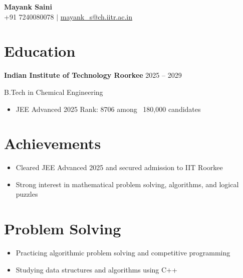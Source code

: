 \documentclass[letterpaper,11pt]{article}
\begin{document}

\begin{center}
\textbf{\Huge Mayank Saini} \\ \vspace{3pt}
+91 7240080078 $|$
\href{mailto:mayank_s@ch.iitr.ac.in}{mayank\_s@ch.iitr.ac.in}
\end{center}


\section{Education}

\textbf{Indian Institute of Technology Roorkee} \hfill 2025 -- 2029

B.Tech in Chemical Engineering

\begin{itemize}[leftmargin=*]
\item JEE Advanced 2025 Rank: 8706 among ~180,000 candidates
\end{itemize}


\section{Achievements}

\begin{itemize}[leftmargin=*]
\item Cleared JEE Advanced 2025 and secured admission to IIT Roorkee
\item Strong interest in mathematical problem solving, algorithms, and logical puzzles
\end{itemize}


\section{Problem Solving}

\begin{itemize}[leftmargin=*]
\item Practicing algorithmic problem solving and competitive programming
\item Studying data structures and algorithms using C++
\end{itemize}
\end{document}
